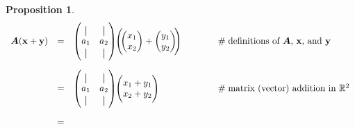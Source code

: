 \documentclass{article}
\theoremstyle{definition}
\newtheorem{proposition}{Proposition}[section]
\newcommand*{\vertbar}{\rule[-1ex]{0.5pt}{2.5ex}}
\begin{document}
\begin{proposition}
\begin{equation*}
\begin{array}{llll}
\bm{A}(\mathbf{x}+\mathbf{y})
&=&
	\left (
		\hspace{-0.50em}
		\begin{array}{cccc}
			\vertbar & \vertbar \\
			a_{1}    & a_{2}    \\
			\vertbar & \vertbar 
		\end{array}
		\hspace{-0.50em}
	\right )
	\hspace{-0.25em}
	\left (
	\hspace{-0.25em}
		\left (
			\hspace{-0.50em}
			\begin{array}{cccc}
				x_1 \\
				x_2
			\end{array}
			\hspace{-0.50em}
		\right ) 
	+
		\left (
			\hspace{-0.50em}
			\begin{array}{cccc}
				y_1 \\
				y_2
			\end{array}
			\hspace{-0.50em}
		\right )
	\hspace{-0.25em}
	\right )                                                &\hspace{3.00em}\mathrel{\#} \text{definitions of $\bm{A}$, $\mathbf{x}$, and $\mathbf{y}$} \\
[25pt]
&=&
	\left (
		\hspace{-0.50em}
		\begin{array}{cccc}
			\vertbar & \vertbar \\
			a_{1}    & a_{2}    \\
			\vertbar & \vertbar 
		\end{array}
		\hspace{-0.50em}
	\right )
	\hspace{-0.25em}
	\Bigg (
		\hspace{-0.50em}
		\begin{array}{cccc}
			x_1 + y_1\\
			x_2 + y_2
		\end{array}
		\hspace{-0.50em}
	\Bigg ) 												&\hspace{3.00em}\mathrel{\#} \text{matrix (vector) addition in $\mathbb{R}^{2}$} \\
[25pt]
&=&

\end{array}
\end{equation*}
\end{proposition}
\end{document}
